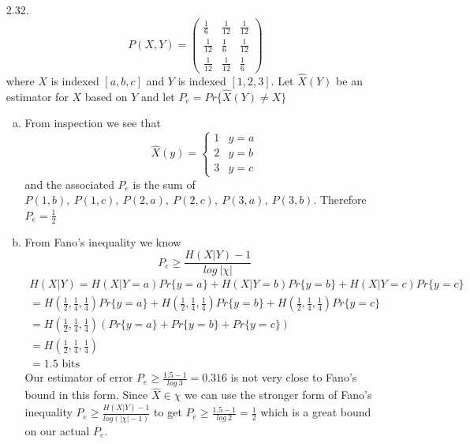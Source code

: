 \documentclass[10pt]{article}
\begin{document}
\begin{itemize}
        \item[2.32.] 
        \[P(X,Y) = \left( \begin{array}{ccc}
\frac{1}{6} & \frac{1}{12} & \frac{1}{12} \\
\frac{1}{12} & \frac{1}{6} & \frac{1}{12} \\
\frac{1}{12} & \frac{1}{12} & \frac{1}{6} \end{array} \right)\]
 where $X$ is indexed $[a,b,c]$ and $Y$ is indexed $[1,2,3]$. Let $\hat{X}(Y)$  be an estimator for $X$ based on $Y$ and let $P_e=Pr\{\hat{X}(Y)\neq X\}$
         \begin{enumerate}[a)]
        \item 
        	From inspection we see that 
        	\[\hat{X}(y)=\left\{ \begin{array}{cc}
        		1 & y=a\\
        		2 & y=b\\
        		3 & y=c \end{array}\right. \]
	and the associated $P_e$ is the sum of $P(1,b),\ P(1,c),\ P(2,a),\ P(2,c),\ P(3,a),\ P(3,b)$. Therefore $P_e=\frac{1}{2}$
        \item 
        	From Fano's inequality we know \[P_e \geq \frac{H(X|Y)-1}{log\ |\chi|}\]
        	\begin{eqnarray*}
        	H(X|Y)= H(X|Y=a)Pr\{y=a\}+H(X|Y=b)Pr\{y=b\}+H(X|Y=c)Pr\{y=c\}\\
        	=H\left(\frac{1}{2},\frac{1}{4},\frac{1}{4}\right)Pr\{y=a\}+H\left(\frac{1}{2},\frac{1}{4},\frac{1}{4}\right)Pr\{y=b\}+H\left(\frac{1}{2},\frac{1}{4},\frac{1}{4}\right)Pr\{y=c\}\\
        	=H\left(\frac{1}{2},\frac{1}{4},\frac{1}{4}\right)\left( Pr\{y=a\}+Pr\{y=b\}+Pr\{y=c\}\right)\\
        	=H\left(\frac{1}{2},\frac{1}{4},\frac{1}{4}\right)\\
        	=1.5 \mbox{ bits}
        	\end{eqnarray*}
        	Our estimator of error $P_e\geq \frac{1.5-1}{log\ 3}=0.316$ is not very close to Fano's bound in this form. Since $\hat{X}\in \chi$ we can use the stronger form of Fano's inequality 
        	\( P_e \geq \frac{H(X|Y)-1}{log(|\chi|-1)}  \) to get \( P_e \geq \frac{1.5-1}{log\ 2}=\frac{1}{2} \) which is a great bound on our actual $P_e$.
        \end{enumerate}

\end{itemize}
\end{document}
